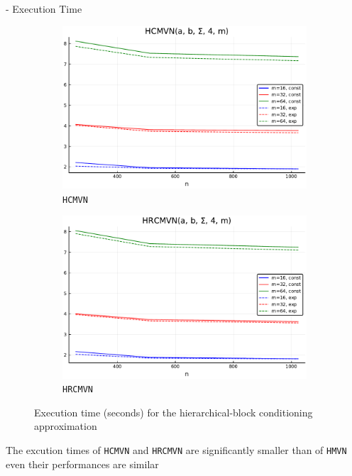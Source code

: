 \begin{frame}[allowframebreaks]{\subsecname - Execution Time}
	\begin{figure}
		\centering
				\begin{subfigure}[b]{0.45\textwidth}
						\centering
						\includegraphics[width=\linewidth]{figs/table3_m2.pdf}
						\caption{\texttt{HCMVN}}
				\end{subfigure}\hfill
				\begin{subfigure}[b]{0.45\textwidth}
						\centering
						\includegraphics[width=\linewidth]{figs/table3_m3.pdf}
						\caption{\texttt{HRCMVN}}
				\end{subfigure}
		\caption{Execution time (seconds) for the hierarchical-block conditioning approximation}\label{fig:table3_hctime}
	\end{figure}	

	The excution times of \texttt{HCMVN} and \texttt{HRCMVN} are significantly smaller than of \texttt{HMVN} even their performances are similar 
	
\end{frame}
